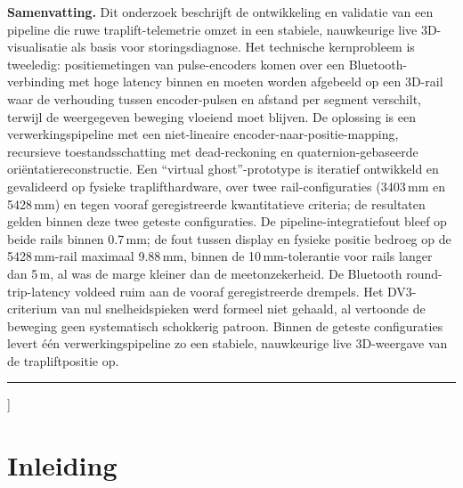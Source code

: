 \documentclass[10pt, a4paper, twocolumn]{article}
\begin{document}
\begin{center}
\begin{minipage}{0.9\textwidth}
\small
\textbf{Samenvatting.}
Dit onderzoek beschrijft de ontwikkeling en validatie van een pipeline die
ruwe traplift-telemetrie omzet in een stabiele, nauwkeurige live
3D-visualisatie als basis voor storingsdiagnose. Het technische kernprobleem is
tweeledig: positiemetingen van pulse-encoders komen over een
Bluetooth-verbinding met hoge latency binnen en moeten worden afgebeeld op een
3D-rail waar de verhouding tussen encoder-pulsen en afstand per segment
verschilt, terwijl de weergegeven beweging vloeiend moet blijven. De oplossing
is een verwerkingspipeline met een niet-lineaire encoder-naar-positie-mapping,
recursieve toestandsschatting met dead-reckoning en quaternion-gebaseerde
oriëntatiereconstructie. Een ``virtual ghost''-prototype is iteratief ontwikkeld
en gevalideerd op fysieke traplifthardware, over twee rail-configuraties
(3403\,mm en 5428\,mm) en tegen vooraf geregistreerde kwantitatieve criteria; de
resultaten gelden binnen deze twee geteste configuraties. De
pipeline-integratiefout bleef op beide rails binnen 0.7\,mm; de fout tussen
display en fysieke positie bedroeg op de 5428\,mm-rail maximaal 9.88\,mm, binnen
de 10\,mm-tolerantie voor rails langer dan 5\,m, al was de marge kleiner dan de
meetonzekerheid. De Bluetooth round-trip-latency voldeed ruim aan de vooraf
geregistreerde drempels. Het DV3-criterium van nul snelheidspieken werd formeel
niet gehaald, al vertoonde de beweging geen systematisch schokkerig patroon. Binnen
de geteste configuraties levert één verwerkingspipeline zo een stabiele,
nauwkeurige live 3D-weergave van de trapliftpositie op.

\end{minipage}
\end{center}
\vspace{0.3cm}
\hrule
\vspace{0.5cm}
] %

\section{Inleiding}
\label{sec:introduction}
\end{document}

